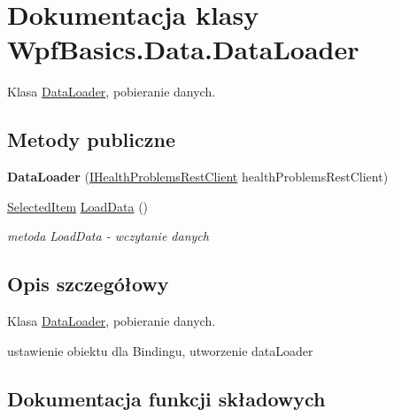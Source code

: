 \hypertarget{class_wpf_basics_1_1_data_1_1_data_loader}{}\section{Dokumentacja klasy Wpf\+Basics.\+Data.\+Data\+Loader}
\label{class_wpf_basics_1_1_data_1_1_data_loader}


Klasa \hyperlink{class_wpf_basics_1_1_data_1_1_data_loader}{Data\+Loader}, pobieranie danych.  


\subsection*{Metody publiczne}
\begin{DoxyCompactItemize}
\item 
\mbox{\label{class_wpf_basics_1_1_data_1_1_data_loader_a59982b631a3e5f3cb376a4f539a6ac0c}} 
{\bfseries Data\+Loader} (\hyperlink{interface_wpf_basics_1_1_data_1_1_i_health_problems_rest_client}{I\+Health\+Problems\+Rest\+Client} health\+Problems\+Rest\+Client)
\item 
\hyperlink{class_wpf_basics_1_1_data_1_1_selected_item}{Selected\+Item} \hyperlink{class_wpf_basics_1_1_data_1_1_data_loader_aa993e4aee4e7404e6458e6221174b4db}{Load\+Data} ()
\begin{DoxyCompactList}\small\item\em metoda Load\+Data -\/ wczytanie danych \end{DoxyCompactList}\end{DoxyCompactItemize}


\subsection{Opis szczegółowy}
Klasa \hyperlink{class_wpf_basics_1_1_data_1_1_data_loader}{Data\+Loader}, pobieranie danych. 

ustawienie obiektu dla Bindingu, utworzenie data\+Loader 

\subsection{Dokumentacja funkcji składowych}
\mbox{\label{class_wpf_basics_1_1_data_1_1_data_loader_aa993e4aee4e7404e6458e6221174b4db}} 
